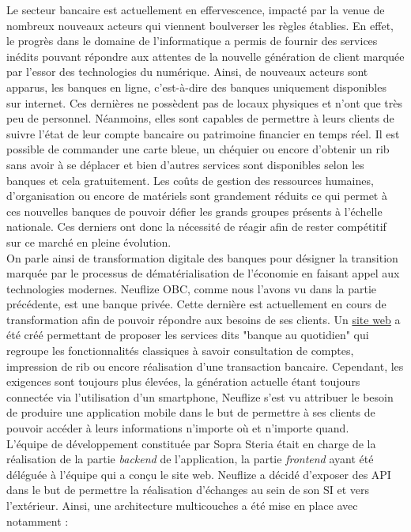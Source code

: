 	Le secteur bancaire est actuellement en effervescence, impacté par la venue de nombreux nouveaux acteurs qui viennent boulverser les règles établies. En effet, le progrès dans le domaine de l'informatique a permis de fournir des services inédits pouvant répondre aux attentes de la nouvelle génération de client marquée par l'essor des technologies du numérique. Ainsi, de nouveaux acteurs sont apparus, les banques en ligne, c'est-à-dire des banques uniquement disponibles sur internet. Ces dernières ne possèdent pas de locaux physiques et n'ont que très peu de personnel. Néanmoins, elles sont capables de permettre à leurs clients de suivre l'état de leur compte bancaire ou patrimoine financier en temps réel. Il est possible de commander une carte bleue, un chéquier ou encore d'obtenir un rib sans avoir à se déplacer et bien d'autres services sont disponibles selon les banques et cela gratuitement. Les coûts de gestion des ressources humaines, d'organisation ou encore de matériels sont grandement réduits ce qui permet à ces nouvelles banques de pouvoir défier les grands groupes présents à l'échelle nationale. Ces derniers ont donc la nécessité de réagir afin de rester compétitif sur ce marché en pleine évolution. \\

	On parle ainsi de transformation digitale des banques pour désigner la transition marquée par le processus de dématérialisation de l'économie en faisant appel aux technologies modernes. Neuflize OBC, comme nous l'avons vu dans la partie précédente, est une banque privée. Cette dernière est actuellement en cours de transformation afin de pouvoir répondre aux besoins de ses clients. Un \href{https://www.neuflizeobc.net/portail/portail.jsp}{site web} a été créé permettant de proposer les services dits "banque au quotidien" qui regroupe les fonctionnalités classiques à savoir consultation de comptes, impression de rib ou encore réalisation d'une transaction bancaire. Cependant, les exigences sont toujours plus élevées, la génération actuelle étant toujours connectée via l'utilisation d'un smartphone, Neuflize s'est vu attribuer le besoin de produire une application mobile dans le but de permettre à ses clients de pouvoir accéder à leurs informations n'importe où et n'importe quand. \\

	L'équipe de développement constituée par Sopra Steria était en charge de la réalisation de la partie \textit{backend} de l'application, la partie \textit{frontend} ayant été déléguée à l'équipe qui a conçu le site web. Neuflize a décidé d'exposer des API dans le but de permettre la réalisation d'échanges au sein de son SI et vers l'extérieur. Ainsi, une architecture multicouches a été mise en place avec notamment :

